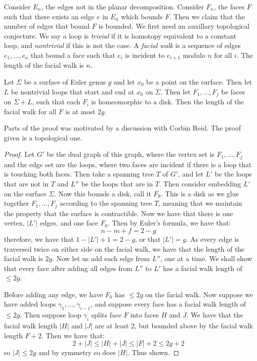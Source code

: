 Consider \(E_n\), the edges not in the planar decomposition. Consider \(F_n\), the faces \(F\) such that there exists an edge \(e\) in \(E_n\) which bounds \(F\). Then we claim that the number of edges that bound \(F\) is bounded. We first need an auxillary topological conjecture. We say a loop is \textit{trivial} if it is homotopy equivalent to a constant loop, and \textit{nontrivial} if this is not the case. A \textit{facial walk} is a sequence of edges \(e_1, \ldots, e_n\) that bound a face such that \(e_i\) is incident to \(e_{i + 1}\) modulo \(n\) for all \(i\). The length of the facial walk is \(n\). 

\begin{lemma}
	Let \(\Sigma \) be a surface of Euler genus \(g\) and let \(x_0\) be a point on the surface. Then let \(L\) be nontrivial loops that start and end at \(x_0\) on \(\Sigma \). Then let \(F_1, \ldots, F_j\) be faces on \(\Sigma + L\), such that each \(F_i\) is homeomorphic to a disk. Then the length of the facial walk for all \(F\) is at most \(2g\). 
\end{lemma}

Parts of the proof was motivated by a discussion with Corbin Reid. The proof given is a topological one. 

\begin{proof}
	Let \(G'\) be the dual graph of this graph, where the vertex set is \(F_1, \ldots, F_j\) and the edge set are the loops, where two faces are incident if there is a loop that is touching both faces. Then take a spanning tree \(T\) of \(G'\), and let \(L'\) be the loops that are not in \(T\) and \(L''\) be the loops that are in \(T\). 
	Then consider embedding \(L'\) on the surface \(\Sigma\). Now this bounds a disk, call it \(F_0\). This is a disk as we glue together \(F_1, \ldots, F_j\) according to the spanning tree \(T\), meaning that we maintain the property that the surface is contractible.
	Now we have that there is one vertex, \(|L'|\) edges, and one face \(F_0\). Then by Euler's formula, we have that:
	\begin{equation}
		n - m + f = 2 - g
	\end{equation}
	therefore, we have that \(1 - |L'| + 1 = 2 - g\), or that \(|L'| = g\). As every edge is traversed twice on either side on the facial walk, we have that the length of the facial walk is \(2g\). 
	Now let us add each edge from \(L''\), one at a time. We shall show that every face after adding all edges from \(L''\) to \(L'\) has a facial walk length of \(\leq 2g\). 
	
	Before adding any edge, we have \(F_0\) has \(\leq 2g\) on the facial walk. Now suppose we have added loops \(\gamma_1, \ldots, \gamma_{i - 1}\), and suppose every face has a facial walk length of \(\leq 2g\). 
	Then suppose loop \(\gamma_i\) splits face \(F\) into faces \(H\) and \(J\). We have that the facial walk length \(|H|\) and \(|J|\) are at least 2, but bounded above by the facial walk length \(F + 2\). Then we have that: 
	\begin{equation}
		2 + |J| \leq |H| + |J| \leq |F| + 2 \leq 2g + 2
	\end{equation}
	so \(|J| \leq 2g\) and by symmetry so does \(|H|\). Thus shown.
\end{proof}


